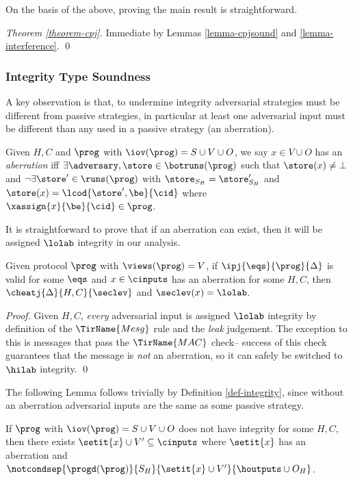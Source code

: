 On the basis of the above, proving the main result is straightforward.
\begin{proof}[Theorem \ref{theorem-cpj}]
  Immediate by Lemmas \ref{lemma-cpjsound} and \ref{lemma-interference}. \qed
\end{proof}

\subsubsection{Integrity Type Soundness}

A key observation is that, to undermine integrity adversarial strategies
must be different from passive strategies, in particular at least one
adversarial input must be different than any used in a passive strategy
(an aberration). 
\begin{definition}
  Given $H,C$ and $\prog$ with $\iov(\prog) = S \cup V \cup O$,
  we say $x \in V \cup O$ has an \emph{aberration} iff
  $\exists \adversary, \store \in \botruns(\prog)$ such that
  $\store(x) \ne \bot$ and $\neg\exists \store' \in \runs(\prog)$
  with  $\store_{S_H} = \store'_{S_H}$ and
  $\store(x) = \lcod{\store',\be}{\cid}$ where
  $\xassign{x}{\be}{\cid} \in \prog$.
\end{definition}
It is straightforward to prove that if an aberration can
exist, then it will be assigned $\lolab$ integrity in our
analysis. 
\begin{lemma}
  \label{lemma-aberration-low}
  Given protocol $\prog$ with
  $\views(\prog) = V$, if 
  $\ipj{\eqs}{\prog}{\Delta}$ is valid
  for some $\eqs$ and $x \in \cinputs$ has an
  aberration for some $H,C$, then $\cheatj{\Delta}{H,C}{\seclev}$
  and $\seclev(x) = \lolab$.
\end{lemma}
\begin{proof}
  Given $H,C$, \emph{every} adversarial input is assigned $\lolab$
  integrity by definition of the $\TirName{Mesg}$ rule and the
  \emph{leak} judgement.  The exception to this is messages that pass
  the $\TirName{MAC}$ check-- success of this check guarantees that
  the message is \emph{not} an aberration, so it can safely be
  switched to $\hilab$ integrity. \qed
\end{proof}
The following Lemma follows trivially by Definition \ref{def-integrity},
since without an aberration adversarial inputs are the same as some passive
strategy.
\begin{lemma}
  \label{lemma-undermined-logic}
  If $\prog$ with $\iov(\prog) = S \cup V \cup O$ does not have
  integrity for some $H,C$, then there exists $\setit{x} \cup V'
  \subseteq \cinputs$ where $\setit{x}$ has an aberration and
  $\notcondsep{\progd(\prog)}{S_H}{\setit{x} \cup V'}{\houtputs \cup O_H}$.
\end{lemma}

